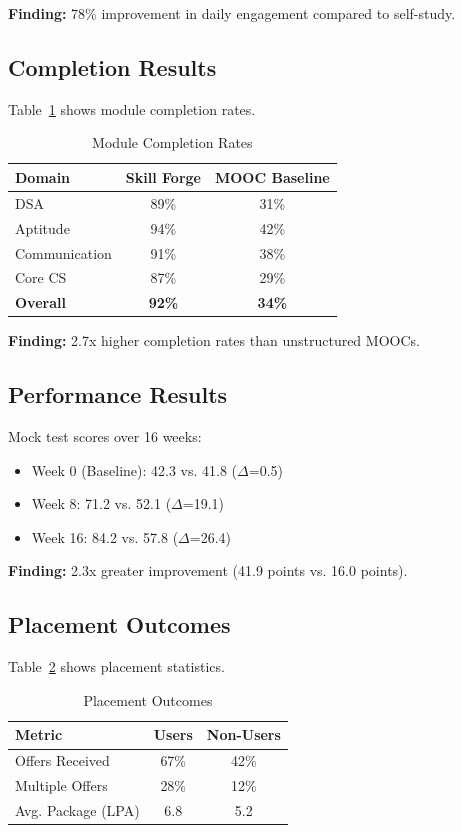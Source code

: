 \documentclass[conference]{IEEEtran}
\begin{document}
\textbf{Finding:} 78\% improvement in daily engagement compared to self-study.

\subsection{Completion Results}

Table~\ref{tab:completion} shows module completion rates.

\begin{table}[htbp]
\caption{Module Completion Rates}
\label{tab:completion}
\centering
\begin{tabular}{lcc}
\toprule
\textbf{Domain} & \textbf{Skill Forge} & \textbf{MOOC Baseline} \\
\midrule
DSA & 89\% & 31\% \\
Aptitude & 94\% & 42\% \\
Communication & 91\% & 38\% \\
Core CS & 87\% & 29\% \\
\textbf{Overall} & \textbf{92\%} & \textbf{34\%} \\
\bottomrule
\end{tabular}
\end{table}

\textbf{Finding:} 2.7x higher completion rates than unstructured MOOCs.

\subsection{Performance Results}

Mock test scores over 16 weeks:
\begin{itemize}
    \item Week 0 (Baseline): 42.3 vs. 41.8 ($\Delta$=0.5)
    \item Week 8: 71.2 vs. 52.1 ($\Delta$=19.1)
    \item Week 16: 84.2 vs. 57.8 ($\Delta$=26.4)
\end{itemize}

\textbf{Finding:} 2.3x greater improvement (41.9 points vs. 16.0 points).

\subsection{Placement Outcomes}

Table~\ref{tab:placement} shows placement statistics.

\begin{table}[htbp]
\caption{Placement Outcomes}
\label{tab:placement}
\centering
\begin{tabular}{lcc}
\toprule
\textbf{Metric} & \textbf{Users} & \textbf{Non-Users} \\
\midrule
Offers Received & 67\% & 42\% \\
Multiple Offers & 28\% & 12\% \\
Avg. Package (LPA) & 6.8 & 5.2 \\
\bottomrule
\end{tabular}
\end{table}
\end{document}
